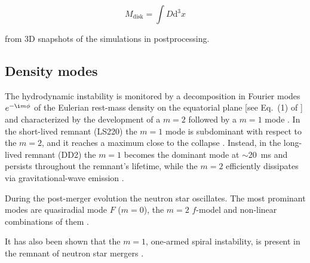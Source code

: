 \documentclass[11pt,a4paper,headinclude=true,DIV=14,BCOR=8mm,chapterprefix,listof=totoc,twoside,openright,abstracton]{scrbook}
\newcommand{\dd}{\text{d}}
\newcommand{\eg}{\textit{e.g.}}
\begin{document}
\begin{equation}
M_{\text{disk}} = \int D \dd^3 x
\end{equation}

from 3D snapshots of the simulations in postprocessing.






\subsection{Density modes}


The hydrodynamic instability is monitored by a decomposition in Fourier modes
$e^{-\i m\phi}$ of the Eulerian rest-mass density on the equatorial plane 
[see Eq.~(1) of \citep{Radice:2016gym}] and characterized by the
development of a $m=2$ followed by a $m=1$ mode 
\citep{East:2015vix,Paschalidis:2015mla,Radice:2016gym,Lehner:2016wjg,Bernuzzi:2013rza,Kastaun:2014fna}.
In the short-lived remnant (LS220) the $m=1$ mode
is subdominant with respect to the $m=2$, and it reaches a maximum close to the collapse
\citep{Bernuzzi:2013rza}. Instead, in the long-lived remnant (DD2) the $m=1$
becomes the dominant mode at $\sim$20~ms and persists throughout the
remnant's lifetime, while the $m=2$ efficiently dissipates via
gravitational-wave emission \citep{Bernuzzi:2015opx,Radice:2016gym}.


During the post-merger evolution the neutron star oscillates. The most prominant modes are quasiradial mode $F$ ($m=0$), the $m=2$ $f$-model and non-linear combinations of them \citep[\eg][]{Shibata:2000jt,Stergioulas:2011gd}.

It has also been shown that the $m=1$, one-armed spiral instability, is present in the remnant of neutron star mergers \citep{Paschalidis:2015mla,Radice:2016gym,East:2016zvv}.
\end{document}
